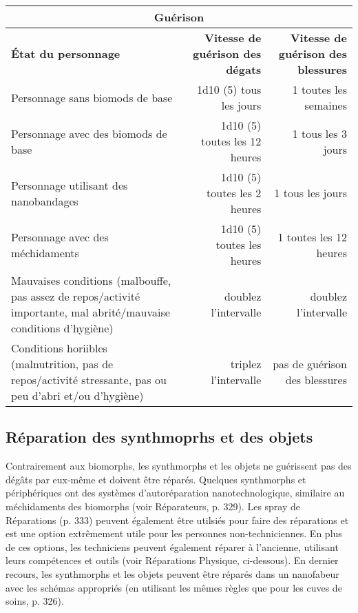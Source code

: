 \begin{table} \begin{tabularx}{\textwidth}{|X|r|r|} \hline

\multicolumn{3}{|c|}{\textbf{Guérison}} \\ \hline

\textbf{État du personnage}	&\textbf{Vitesse de guérison des dégats}	&\textbf{Vitesse de guérison des blessures} \\ \hline

Personnage sans biomods de base	&1d10 (5) tous les  jours &1 toutes les semaines	\\ \hline

Personnage avec des biomods de base	&1d10 (5) toutes les 12 heures	&1 tous les 3 jours	\\ \hline

Personnage utilisant des nanobandages	&1d10 (5) toutes les 2 heures	&1 tous les jours	\\ \hline

Personnage avec des méchidaments	&1d10 (5) toutes les heures	&1 toutes les 12 heures	\\ \hline

Mauvaises conditions (malbouffe, pas assez de repos/activité importante, mal abrité/mauvaise conditions d'hygiène) &doublez l'intervalle &doublez l'intervalle \\ \hline

Conditions horiibles (malnutrition, pas de repos/activité stressante, pas ou peu d'abri et/ou d'hygiène) &triplez l'intervalle &pas de guérison des blessures\\ \hline

\end{tabularx} \label{tab:healing} \end{table} 



\subsection{Réparation des synthmoprhs et des objets} 

Contrairement aux biomorphs, les synthmorphs et les objets ne guérissent pas des dégâts par eux-même et doivent être réparés. Quelques synthmorphs et périphériques ont des systèmes d'autoréparation nanotechnologique, similaire au méchidaments des biomorphs (voir Réparateurs, p. 329). Les spray de Réparations (p. 333) peuvent également être utilsiés pour faire des réparations et est une option extrêmement utile pour les personnes non-techniciennes. En plus de ces options, les techniciens peuvent également réparer à l'ancienne, utilisant leurs compétences et outils (voir Réparations Physique, ci-dessous). En dernier recours, les synthmorphs et les objets peuvent être réparés dans un nanofabeur avec les schémas appropriés (en utilisant les mêmes règles que pour les cuves de soins, p. 326). 

